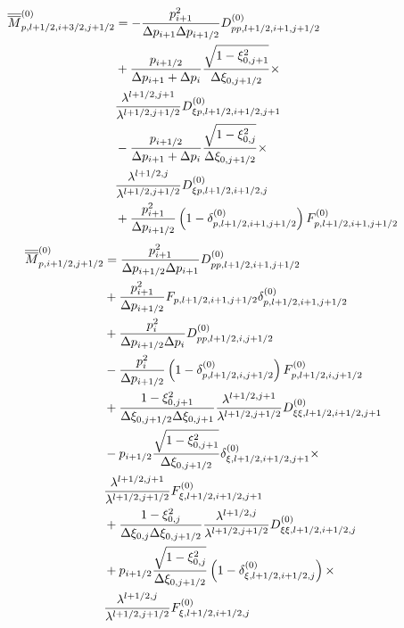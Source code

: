\begin{align}
\overline{\overline{M}}_{p,l+1/2,i+3/2,j+1/2}^{\left( 0\right) } & =-\frac{%
p_{i+1}^{2}}{\Delta p_{i+1}\Delta p_{i+1/2}}D_{pp,l+1/2,i+1,j+1/2}^{\left(
0\right) }  \notag \\
& +\frac{p_{i+1/2}}{\Delta p_{i+1}+\Delta p_{i}}\frac{\sqrt{1-\xi_{0,j+1}^{2}%
}}{\Delta\xi_{0,j+1/2}}\times  \notag \\
& \frac{\lambda^{l+1/2,j+1}}{\lambda^{l+1/2,j+1/2}}D_{\xi
p,l+1/2,i+1/2,j+1}^{\left( 0\right) }  \notag \\
& -\frac{p_{i+1/2}}{\Delta p_{i+1}+\Delta p_{i}}\frac{\sqrt{1-\xi_{0,j}^{2}}%
}{\Delta\xi_{0,j+1/2}}\times  \notag \\
& \frac{\lambda^{l+1/2,j}}{\lambda^{l+1/2,j+1/2}}D_{\xi
p,l+1/2,i+1/2,j}^{\left( 0\right) }  \notag \\
& +\frac{p_{i+1}^{2}}{\Delta p_{i+1/2}}\left(
1-\delta_{p,l+1/2,i+1,j+1/2}^{\left( 0\right) }\right)
F_{p,l+1/2,i+1,j+1/2}^{\left( 0\right) }
\end{align}
\begin{align}
\overline{\overline{M}}_{p,i+1/2,j+1/2}^{\left( 0\right) } & =\frac{%
p_{i+1}^{2}}{\Delta p_{i+1/2}\Delta p_{i+1}}D_{pp,l+1/2,i+1,j+1/2}^{\left(
0\right) }  \notag \\
& +\frac{p_{i+1}^{2}}{\Delta p_{i+1/2}}F_{p,l+1/2,i+1,j+1/2}\delta
_{p,l+1/2,i+1,j+1/2}^{\left( 0\right) }  \notag \\
& +\frac{p_{i}^{2}}{\Delta p_{i+1/2}\Delta p_{i}}D_{pp,l+1/2,i,j+1/2}^{%
\left( 0\right) }  \notag \\
& -\frac{p_{i}^{2}}{\Delta p_{i+1/2}}\left(
1-\delta_{p,l+1/2,i,j+1/2}^{\left( 0\right) }\right)
F_{p,l+1/2,i,j+1/2}^{\left( 0\right) }  \notag \\
& +\frac{1-\xi_{0,j+1}^{2}}{\Delta\xi_{0,j+1/2}\Delta\xi_{0,j+1}}\frac{%
\lambda^{l+1/2,j+1}}{\lambda^{l+1/2,j+1/2}}D_{\xi\xi,l+1/2,i+1/2,j+1}^{%
\left( 0\right) }  \notag \\
& -p_{i+1/2}\frac{\sqrt{1-\xi_{0,j+1}^{2}}}{\Delta\xi_{0,j+1/2}}\delta
_{\xi,l+1/2,i+1/2,j+1}^{\left( 0\right) }\times  \notag \\
& \frac{\lambda^{l+1/2,j+1}}{\lambda^{l+1/2,j+1/2}}F_{\xi,l+1/2,i+1/2,j+1}^{%
\left( 0\right) }  \notag \\
& +\frac{1-\xi_{0,j}^{2}}{\Delta\xi_{0,j}\Delta\xi_{0,j+1/2}}\frac {%
\lambda^{l+1/2,j}}{\lambda^{l+1/2,j+1/2}}D_{\xi\xi,l+1/2,i+1/2,j}^{\left(
0\right) }  \notag \\
& +p_{i+1/2}\frac{\sqrt{1-\xi_{0,j}^{2}}}{\Delta\xi_{0,j+1/2}}\left(
1-\delta_{\xi,l+1/2,i+1/2,j}^{\left( 0\right) }\right) \times  \notag \\
& \frac{\lambda^{l+1/2,j}}{\lambda^{l+1/2,j+1/2}}F_{\xi,l+1/2,i+1/2,j}^{%
\left( 0\right) }
\end{align}
